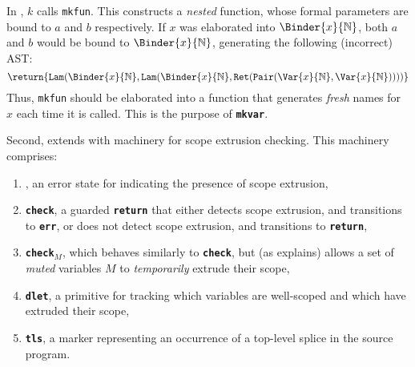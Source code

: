 \begin{enumerate}
In , $k$ calls \texttt{mkfun}. This constructs a \textit{nested} function, whose formal parameters are bound to $a$ and $b$ respectively. If $x$ was elaborated into $\Binder{x}{\mathbb{N}}$, both $a$ and $b$ would be bound to $\Binder{x}{\mathbb{N}}$, generating the following (incorrect) AST: 
 \[\return{\texttt{Lam}(\Binder{x}{\mathbb{N}}, \texttt{Lam}(\Binder{x}{\mathbb{N}}, \texttt{Ret}(\texttt{Pair}(\Var{x}{\mathbb{N}}, \Var{x}{\mathbb{N}}))))}\]
 Thus, \texttt{mkfun} should be elaborated into a function that generates \textit{fresh} names for $x$ each time it is called. This is the purpose of \textbf{\texttt{mkvar}}. 
\end{enumerate}

Second, \coreLang{} extends \efflang{} with machinery for scope extrusion checking. This machinery comprises:
\begin{enumerate}
\item \err{}, an error state for indicating the presence of scope extrusion,
\item \textbf{\texttt{check}}, a guarded \textbf{\texttt{return}} that either detects scope extrusion, and transitions to \textbf{\texttt{err}}, or does not detect scope extrusion, and transitions to \textbf{\texttt{return}},
\item \textbf{\texttt{check$_M$}}, which behaves similarly to \textbf{\texttt{check}}, but (as  explains) allows a set of \textit{muted} variables $M$ to \textit{temporarily} extrude their scope,
\item \textbf{\texttt{dlet}}, a primitive for tracking which variables are well-scoped and which have extruded their scope,
\item \textbf{\texttt{tls}}, a marker representing an occurrence of a top-level splice in the source program. 
\end{enumerate}

